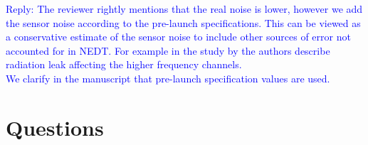 \documentclass[11pt,a4paper,draft]{article}
\begin{document}
\begin{itemize}
\textcolor{blue}{Reply: The reviewer rightly mentions that the real noise is lower, however we add the sensor noise according to the pre-launch specifications. This can be viewed as a conservative estimate of the sensor noise to include other sources of error not accounted for in NEDT. For example in the study by \citet{Carminati-fy3d-2020} the authors describe radiation leak affecting the higher frequency channels.\\
We clarify in the manuscript that pre-launch specification values are used.}

\end{itemize}

		
		
\section*{Questions}
\end{document}
